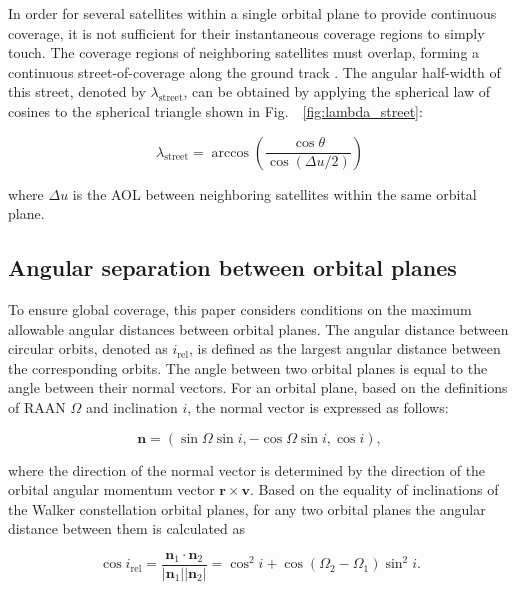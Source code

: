In order for several satellites within a single orbital plane to provide continuous coverage, 
it is not sufficient for their instantaneous coverage regions to simply touch. The coverage regions 
of neighboring satellites must overlap, forming a continuous street-of-coverage along the ground track \cite{ulybyshev2014, wertz2001ocdm}. 
The angular half-width of this street, denoted by $\lambda_{\mathrm{street}}$, can be obtained by applying 
the spherical law of cosines to the spherical triangle shown in Fig.~~\ref{fig:lambda_street}:

\begin{equation}
\lambda_{\mathrm{street}} = \arccos\left(\frac{\cos\theta}{\cos\left(\Delta u/2\right)}\right)
\end{equation}

where $\Delta u$ is the AOL between neighboring satellites within the same orbital plane. 

\subsection{Angular separation between orbital planes}

To ensure global coverage, this paper considers conditions on the maximum allowable angular 
distances between orbital planes. The angular distance between circular orbits, denoted 
as $i_{\mathrm{rel}}$, is defined as the largest angular distance between the corresponding orbits.
The angle between two orbital planes is equal to the angle between their normal vectors. 
For an orbital plane, based on the definitions of RAAN $\Omega$ and inclination $i$, the normal vector 
is expressed as follows:

\begin{equation}
\mathbf{n}=
\left(
\sin\Omega\sin i,
-\cos\Omega\sin i,
\cos i
\right),
\end{equation}

where the direction of the normal vector is determined by the direction of the orbital 
angular momentum vector $\mathbf{r}\times\mathbf{v}$.
Based on the equality of inclinations of the Walker constellation orbital planes, 
for any two orbital planes the angular distance between them is calculated as

\begin{equation}
\cos i_{\mathrm{rel}}=\frac{\mathbf{n}_1\cdot\mathbf{n}_2}{|\mathbf{n}_1||\mathbf{n}_2|}=\cos^2 i+\cos(\Omega_2-\Omega_1)\sin^2 i.
\end{equation}


